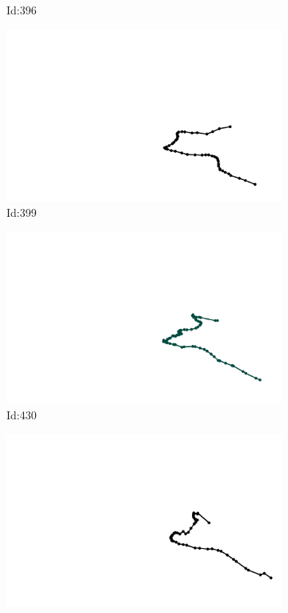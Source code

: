 \documentclass[12pt,twoside]{report}
\begin{document}
\begin{figure}
\begin{subfigure}[b]{0.20\textwidth}
\caption{Id:396}
\end{subfigure}
\begin{subfigure}[b]{0.20\textwidth}
\centering
\includegraphics[width=\textwidth]{../../trajectories/399.png}
\caption{Id:399}
\end{subfigure}
\begin{subfigure}[b]{0.20\textwidth}
\centering
\includegraphics[width=\textwidth]{../../trajectories/430.png}
\caption{Id:430}
\end{subfigure}
\begin{subfigure}[b]{0.20\textwidth}
\centering
\includegraphics[width=\textwidth]{../../trajectories/434.png}

\end{subfigure}
\end{figure}
\end{document}
